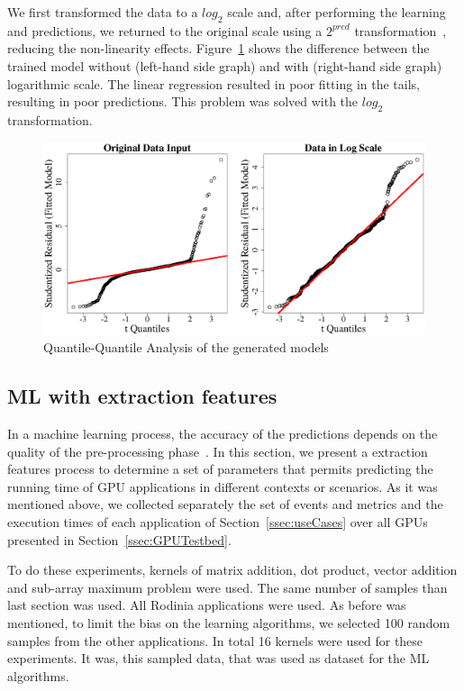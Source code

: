 We first transformed the data to a $log_2$ scale and, after performing the learning and predictions, we returned to the original scale using a $2^{pred}$ transformation~\citep{Barnes:2008:RAS}, reducing the non-linearity effects. Figure~\ref{fig:QQplot} shows the difference between the trained model without (left-hand side graph) and with (right-hand side graph) logarithmic scale. The linear regression resulted in poor fitting in the tails, resulting in poor predictions. This problem was solved with the $log_2$ transformation.

\begin{figure}[htpb]
 \centering
 \includegraphics[scale=.3]{./images/QQplot.eps}
 \caption{Quantile-Quantile Analysis of the generated models}
 \label{fig:QQplot}
\end{figure}


\subsection{ML with extraction features}\label{ssec:methodExrtact}

In a machine learning process, the accuracy of the predictions depends on the quality of the pre-processing phase~\citep{Dasu:2003:EDM:861869}. In this section, we present a extraction features process to determine a set of parameters that permits predicting the running time of GPU applications in different contexts or scenarios. As it was mentioned above, we collected separately the set of events and metrics and the execution times of each application of Section~\ref{ssec:useCases} over all GPUs presented in Section~\ref{ssec:GPUTestbed}. 

To do these experiments, kernels of matrix addition, dot product, vector addition and sub-array maximum problem were used. The same number of samples than last section was used. All Rodinia applications were used. As before was mentioned, to limit the bias on the learning algorithms, we selected 100 random samples from the other applications. In total 16 kernels were used for these experiments. It was, this sampled data, that was used as dataset for the ML algorithms. 


